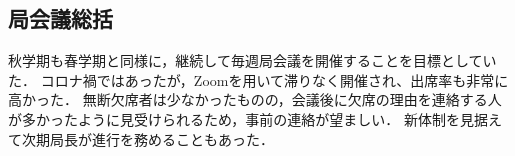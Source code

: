 \subsection*{局会議総括}


秋学期も春学期と同様に，継続して毎週局会議を開催することを目標としていた．
コロナ禍ではあったが，Zoomを用いて滞りなく開催され、出席率も非常に高かった．
無断欠席者は少なかったものの，会議後に欠席の理由を連絡する人が多かったように見受けられるため，事前の連絡が望ましい．
新体制を見据えて次期局長が進行を務めることもあった．

